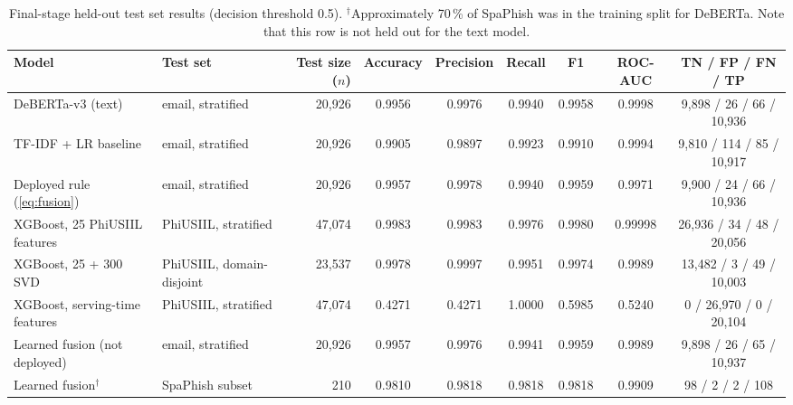 \documentclass[conference]{IEEEtran}
\begin{document}
\begin{table}[t]
\centering
\caption{Final-stage held-out test set results (decision threshold 0.5). $^{\dagger}$Approximately 70\,\% of SpaPhish was in the training split for DeBERTa. Note that this row is not held out for the text model.}
\label{tab:final}
\begin{adjustbox}{max width=\textwidth}
\begin{tabular}{llrcccccc}
\toprule
Model & Test set & Test size ($n$) & Accuracy & Precision & Recall & F1 & ROC-AUC & TN / FP / FN / TP \\
\midrule
DeBERTa-v3 (text) & email, stratified & 20,926 & 0.9956 & 0.9976 & 0.9940 & 0.9958 & 0.9998 & 9,898 / 26 / 66 / 10,936 \\
TF-IDF + LR baseline & email, stratified & 20,926 & 0.9905 & 0.9897 & 0.9923 & 0.9910 & 0.9994 & 9,810 / 114 / 85 / 10,917 \\
Deployed rule (\ref{eq:fusion}) & email, stratified & 20,926 & 0.9957 & 0.9978 & 0.9940 & 0.9959 & 0.9971 & 9,900 / 24 / 66 / 10,936 \\
XGBoost, 25 PhiUSIIL features & PhiUSIIL, stratified & 47,074 & 0.9983 & 0.9983 & 0.9976 & 0.9980 & 0.99998 & 26,936 / 34 / 48 / 20,056 \\
XGBoost, 25 + 300 SVD & PhiUSIIL, domain-disjoint & 23,537 & 0.9978 & 0.9997 & 0.9951 & 0.9974 & 0.9989 & 13,482 / 3 / 49 / 10,003 \\
XGBoost, serving-time features & PhiUSIIL, stratified & 47,074 & 0.4271 & 0.4271 & 1.0000 & 0.5985 & 0.5240 & 0 / 26,970 / 0 / 20,104 \\
Learned fusion (not deployed) & email, stratified & 20,926 & 0.9957 & 0.9976 & 0.9941 & 0.9959 & 0.9989 & 9,898 / 26 / 65 / 10,937 \\
Learned fusion$^{\dagger}$ & SpaPhish subset & 210 & 0.9810 & 0.9818 & 0.9818 & 0.9818 & 0.9909 & 98 / 2 / 2 / 108 \\
\bottomrule
\end{tabular}
\end{adjustbox}
\end{table}
\end{document}
